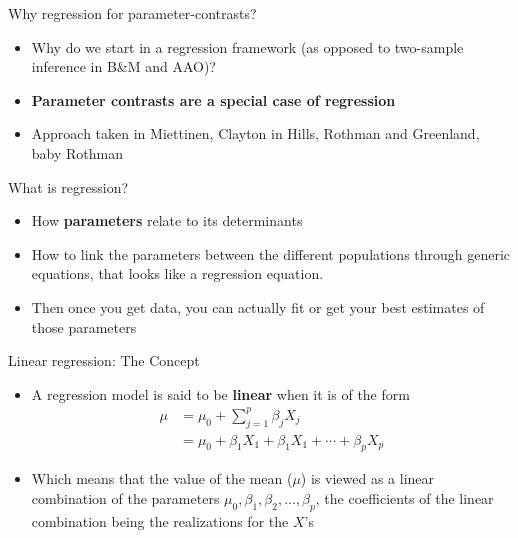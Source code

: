 \documentclass[handout]{beamer}\usepackage[]{graphicx}\usepackage[]{color}
\begin{document}
\begin{frame}{Why regression for parameter-contrasts?}

\begin{itemize}
	\setlength\itemsep{1.5em}
\item Why do we start in a regression framework (as opposed to two-sample inference in B\&M and AAO)? \pause 
\item \textbf{Parameter contrasts are a special case of regression} \pause 
\item Approach taken in Miettinen, Clayton in Hills, Rothman and Greenland, baby Rothman
\end{itemize}

\end{frame}


\begin{frame}{What is regression?}

\begin{itemize}
	\setlength\itemsep{2em}
\item How \textbf{parameters} relate to its determinants \pause
\item How to link the parameters between the different populations through generic equations, that looks like a regression equation. \pause 
\item Then once you get data, you can actually fit or get your best estimates of those parameters
\end{itemize}

\end{frame}

\begin{frame}{Linear regression: The Concept}

\begin{itemize}
	\setlength\itemsep{2em}
	\item A regression model is said to be \textbf{linear} when it is of the form 
	\begin{align*}
	\mu & = \mu_0 + \sum_{j=1}^p \beta_j X_j \\
	& = \mu_0 + \beta_1 X_1 +  \beta_1 X_1 + \cdots +  \beta_p X_p
	\end{align*}
	
	\item Which means that the value of the mean ($\mu$) is viewed as a linear combination of the parameters $\mu_0, \beta_1, \beta_2, \ldots, \beta_p$, the coefficients of the linear combination being the realizations for the $X$'s

\end{itemize}

\end{frame}
\end{document}
